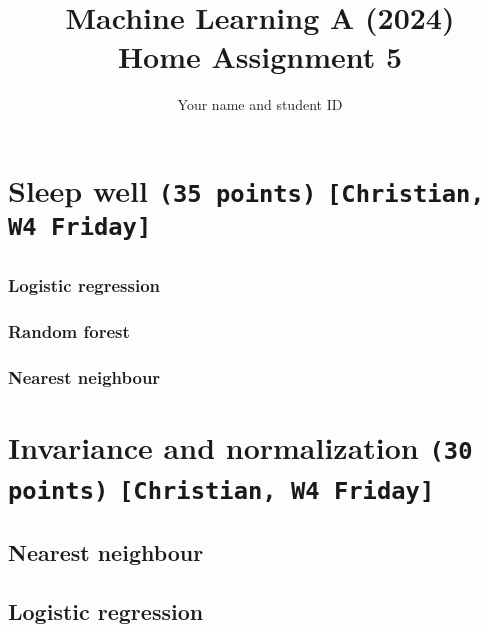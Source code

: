 \documentclass[a4paper,12pt]{article}
\newcommand{\authorpoints}[2]{{\large \texttt{(#2 points)} \texttt{[#1]}}}
\begin{document}
\title{Machine Learning A (2024)\\Home Assignment 5}
\author{\color{red}Your name and student ID}
\date{}
\maketitle

\tableofcontents %




\section{Sleep well \authorpoints{Christian, W4 Friday}{35}}
    \subsection{} %

    \subsection{} %
        \subsubsection{Logistic regression}

        \subsubsection{Random forest}

        \subsubsection{Nearest neighbour}
        





\section{Invariance and normalization \authorpoints{Christian, W4 Friday}{30}}
    \subsection{Nearest neighbour} %

    \subsection{Logistic regression} %
    
\end{document}
